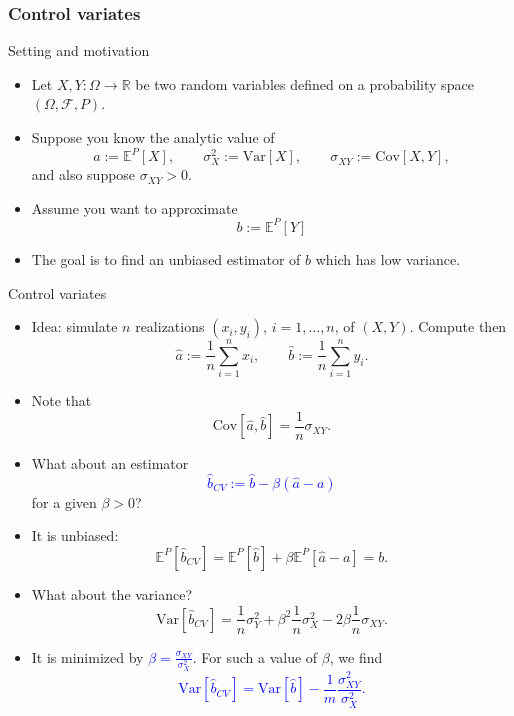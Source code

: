 \documentclass[9 pt]{beamer} %
\def \blue {\textcolor{blue}}
\def \F {\mathcal{F}}
\def \bE {\mathbb{E}}
\begin{document}
\subsubsection{Control variates}
\frame{  \tableofcontents[
    sectionstyle=show/shaded,
    subsectionstyle=show/shaded/shaded,
    subsubsectionstyle=show/shaded/shaded/shaded
    ]}


\begin{frame}{Setting and motivation}
\begin{itemize}
\item Let $X, Y: \Omega \to \mathbb{R}$ be two random variables defined on a probability space $(\Omega, \F, P)$.
\item Suppose you know the analytic value of 
$$
a:= \bE^P[X], \qquad \sigma_{X}^2 := \text{Var}[X], \qquad \sigma_{XY}:=\text{Cov}[X, Y],
$$
and also suppose $\sigma_{XY}>0$. 
\item Assume you want to approximate 
$$
b:=\bE^P[Y]
$$
\item The goal is to find an unbiased estimator of $b$ which has low variance.
\end{itemize}
\end{frame}


\begin{frame}{Control variates}
\begin{itemize}
\item Idea: simulate $n$ realizations $(x_i, y_i)$, $i=1,\dots,n$, of $(X,Y)$. Compute then
$$
\hat a := \frac{1}{n}\sum_{i=1}^n x_i, \qquad \hat b := \frac{1}{n}\sum_{i=1}^n y_i.
$$ 
\item Note that 
$$
\text{Cov}[\hat a, \hat b]=\frac{1}{n} \sigma_{XY}.
$$
\item What about an estimator 
\blue{$$
\hat b_{CV}:= \hat b - \beta(\hat a - a)
$$}
for a given $\beta>0$?
\item It is unbiased:
$$
\bE^P[\hat b_{CV}] = \bE^P[\hat b] + \beta \bE^P[\hat a - a] = b.  
$$
\item What about the variance? 
$$
\text{Var}[\hat b_{CV}] = \frac{1}{n} \sigma_{Y}^2 + \beta^2  \frac{1}{n} \sigma_{X}^2 -2\beta \frac{1}{n} \sigma_{XY}.
$$
\item It is minimized by \blue{$\beta=\frac{\sigma_{XY}}{\sigma_X^2}$}. For such a value of $\beta$, we find
\blue{$$
\text{Var}[\hat b_{CV}] = \text{Var}[\hat b] -  \frac{1}{m}\frac{\sigma_{XY}^2}{\sigma_X^2}.
$$}
\end{itemize}
\end{frame}
\end{document}
